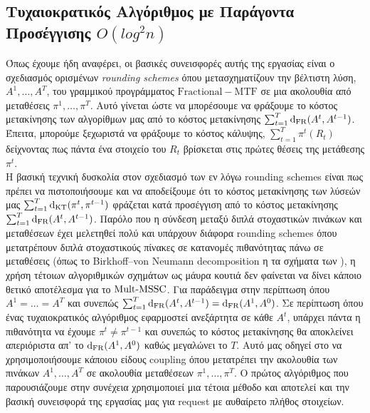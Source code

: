 \subsection{Τυχαιοκρατικός Αλγόριθμος με Παράγοντα Προσέγγισης $O(log^2n)$}

Όπως έχουμε ήδη αναφέρει, οι βασικές συνεισφορές αυτής της εργασίας είναι ο σχεδιασμός ορισμένων \textit{rounding schemes} όπου μετασχηματίζουν την βέλτιστη λύση, $A^1,\ldots,A^T$, του γραμμικού προγράμματος $\mathrm{Fractional- MTF}$ σε μια ακολουθία από μεταθέσεις $\pi^1,\ldots,\pi^T$. Αυτό γίνεται ώστε να μπορέσουμε να φράξουμε το κόστος μετακίνησης των αλγορίθμων μας από το κόστος μετακίνησης $\sum_{t=1}^T \mathrm{d}_{\mathrm{FR}}(A^t,A^{t-1})$. Έπειτα, μπορούμε ξεχωριστά να φράξουμε το κόστος κάλυψης, $\sum_{t=1}^T \pi^t(R_t)$ δείχνοντας πως πάντα ένα στοιχείο του $R_t$ βρίσκεται στις πρώτες θέσεις της μετάθεσης $\pi^t$. \\

Η βασική τεχνική δυσκολία στον σχεδιασμό των εν λόγω rounding schemes είναι πως πρέπει να πιστοποιήσουμε και να αποδείξουμε ότι το κόστος μετακίνησης των λύσεών μας $\sum_{t=1}^T\mathrm{d}_{\mathrm{KT}}(\pi^t,\pi^{t-1})$ φράζεται κατά προσέγγιση από το κόστος μετακίνησης $\sum_{t=1}^T\mathrm{d}_{\mathrm{FR}}(A^t,A^{t-1})$. Παρόλο που η σύνδεση μεταξύ διπλά στοχαστικών πινάκων και μεταθέσεων έχει μελετηθεί πολύ και υπάρχουν διάφορα rounding schemes όπου μετατρέπουν διπλά στοχαστικούς πίνακες σε κατανομές πιθανότητας πάνω σε μεταθέσεις (όπως το Birkhoff–von Neumann decomposition η τα σχήματα των \cite{BGK10,SW11,BBFT20,FKKSV20}), η χρήση τέτοιων αλγοριθμικών σχημάτων ως μάυρα κουτιά δεν φαίνεται να δίνει κάποιο θετικό αποτέλεσμα για το $\mathrm{Mult}\text{-}\mathrm{MSSC}$. Για παράδειγμα στην περίπτωση όπου $A^1 = \dots = A^T$ και συνεπώς $\sum_{t=1}^T \mathrm{d}_{\mathrm{FR}}(A^t,A^{t-1}) = \mathrm{d}_{\mathrm{FR}}(A^1,A^0)$. Σε περίπτωση όπου ένας τυχαιοκρατικός αλγόριθμος εφαρμοστεί ανεξάρτητα σε κάθε $A^t$, υπάρχει πάντα η πιθανότητα να έχουμε $\pi^t \neq \pi^{t-1}$ και συνεπώς το κόστος μετακίνησης θα αποκλείνει απεριόριστα απ' το $\mathrm{d}_{\mathrm{FR}}(A^1,A^0)$ καθώς μεγαλώνει το $T$. Αυτό μας οδηγεί στο να χρησιμοποιήσουμε κάποιου είδους coupling όπου μετατρέπει την ακολουθία των πινάκων $A^1,\ldots,A^T$ σε ακολουθία μεταθέσεων $\pi^1,\ldots,\pi^T$. Ο πρώτος αλγόριθμος που παρουσιάζουμε στην συνέχεια χρησιμοποιεί μια τέτοια μέθοδο και αποτελεί και την βασική συνεισφορά της εργασίας μας για request με αυθαίρετο πλήθος στοιχείων.

